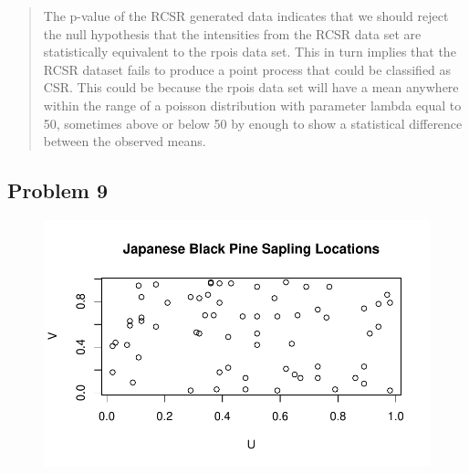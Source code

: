 \documentclass[
  letterpaper,
  DIV=11,
  numbers=noendperiod]{scrartcl}
\newenvironment{Shaded}{\begin{snugshade}}{\end{snugshade}}
\newcommand{\AttributeTok}[1]{\textcolor[rgb]{0.40,0.45,0.13}{#1}}
\newcommand{\FunctionTok}[1]{\textcolor[rgb]{0.28,0.35,0.67}{#1}}
\newcommand{\NormalTok}[1]{\textcolor[rgb]{0.00,0.23,0.31}{#1}}
\newcommand{\OtherTok}[1]{\textcolor[rgb]{0.00,0.23,0.31}{#1}}
\newcommand{\SpecialCharTok}[1]{\textcolor[rgb]{0.37,0.37,0.37}{#1}}
\newcommand{\StringTok}[1]{\textcolor[rgb]{0.13,0.47,0.30}{#1}}
\begin{document}
\begin{quote}
The p-value of the RCSR generated data indicates that we should reject
the null hypothesis that the intensities from the RCSR data set are
statistically equivalent to the rpois data set. This in turn implies
that the RCSR dataset fails to produce a point process that could be
classified as CSR. This could be because the rpois data set will have a
mean anywhere within the range of a poisson distribution with parameter
lambda equal to 50, sometimes above or below 50 by enough to show a
statistical difference between the observed means.
\end{quote}

\hypertarget{problem-9}{%
\subsection{Problem 9}\label{problem-9}}

\begin{Shaded}
\end{Shaded}

\begin{figure}[H]

{\centering \includegraphics{robby_homework1_files/figure-pdf/unnamed-chunk-13-1.pdf}

}

\end{figure}
\end{document}
